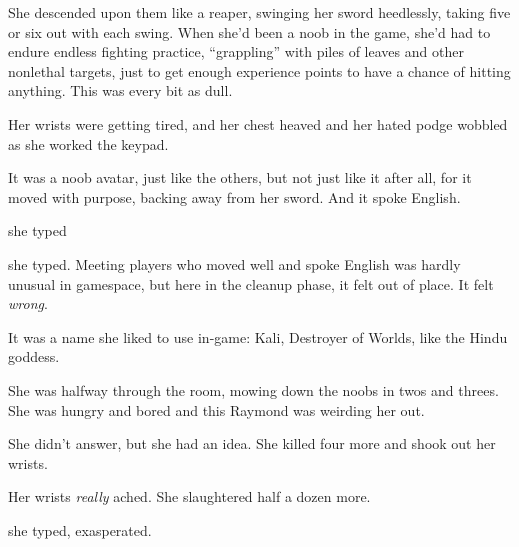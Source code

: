 She descended upon them like a reaper, swinging her sword
heedlessly, taking five or six out with each swing. When she’d been
a noob in the game, she’d had to endure endless fighting practice,
“grappling” with piles of leaves and other nonlethal targets, just
to get enough experience points to have a chance of hitting
anything. This was every bit as dull.

Her wrists were getting tired, and her chest heaved and her hated
podge wobbled as she worked the keypad.

It was a noob avatar, just like the others, but not just like it
after all, for it moved with purpose, backing away from her sword.
And it spoke English.

she typed

she typed. Meeting players who moved well and spoke English was
hardly unusual in gamespace, but here in the cleanup phase, it felt
out of place. It felt \emph{wrong}.

It was a name she liked to use in-game: Kali, Destroyer of Worlds,
like the Hindu goddess.

She was halfway through the room, mowing down the noobs in twos and
threes. She was hungry and bored and this Raymond was weirding her
out.


She didn’t answer, but she had an idea. She killed four more and
shook out her wrists.

Her wrists \emph{really} ached. She slaughtered half a dozen more.

she typed, exasperated.

